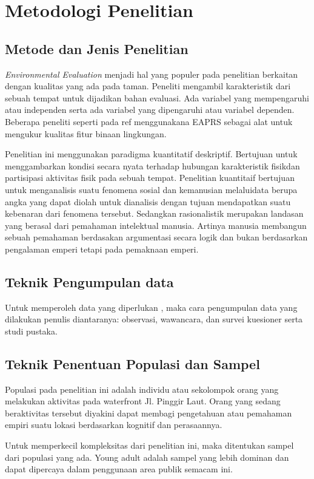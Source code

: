 \documentclass[../projects/thesis.tex]{subfiles}
\begin{document}
\chapter{Metodologi Penelitian}\label{chap:method}

\section{Metode dan Jenis Penelitian}

\textit{Environmental Evaluation} menjadi hal yang populer pada penelitian berkaitan dengan kualitas yang ada pada taman.  Peneliti mengambil karakteristik dari sebuah tempat untuk dijadikan bahan evaluasi. Ada variabel yang mempengaruhi atau independen serta ada variabel yang dipengaruhi atau variabel dependen. Beberapa peneliti seperti pada ref{} menggunakana EAPRS sebagai alat untuk mengukur kualitas fitur binaan lingkungan.

Penelitian ini menggunakan paradigma kuantitatif deskriptif. Bertujuan untuk menggambarkan kondisi secara nyata terhadap hubungan karakteristik fisikdan partisipasi aktivitas fisik pada sebuah tempat.
Penelitian kuantitaif bertujuan untuk menganalisis suatu fenomena sosial dan kemanusian melaluidata berupa angka yang dapat diolah untuk dianalisis dengan tujuan mendapatkan suatu kebenaran dari fenomena tersebut.
Sedangkan rasionalistik merupakan landasan yang berasal dari pemahaman intelektual manusia. Artinya manusia membangun sebuah pemahaman berdasakan argumentasi secara logik dan bukan berdasarkan pengalaman emperi tetapi pada pemaknaan emperi\citep{muhadjir1996metodologi}.

\section{Teknik Pengumpulan data}
Untuk memperoleh data yang diperlukan , maka cara pengumpulan data yang dilakukan penulis diantaranya: observasi, wawancara, dan survei kuesioner serta studi pustaka.

\section{Teknik Penentuan Populasi dan Sampel}

Populasi pada penelitian ini adalah individu atau sekolompok orang yang melakukan aktivitas pada waterfront Jl. Pinggir Laut. Orang yang sedang beraktivitas tersebut diyakini dapat membagi pengetahuan atau pemahaman empiri suatu lokasi berdasarkan kognitif dan perasaannya.

Untuk memperkecil kompleksitas dari penelitian ini, maka ditentukan sampel dari populasi yang ada. Young adult adalah sampel yang lebih dominan dan dapat  dipercaya dalam penggunaan area publik semacam ini.

\end{document}
